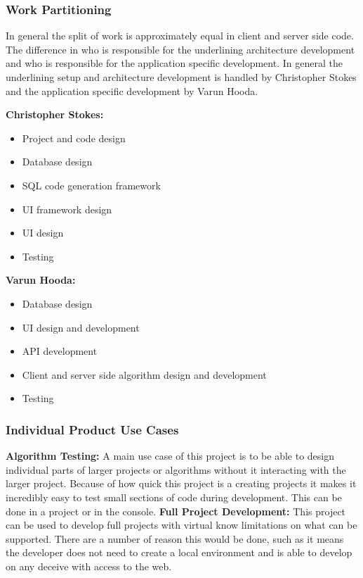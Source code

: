 \documentclass[12pt, titlepage]{article}
\begin{document}
    \subsubsection{Work Partitioning}
    In general the split of work is approximately equal in client and server 
    side code. The difference in who is responsible for the underlining architecture 
    development and who is responsible for the application specific development. In 
    general the underlining setup and architecture development is handled by 
    Christopher Stokes and the application specific development by Varun Hooda.

    \textbf{Christopher Stokes:}
    \begin{itemize}
        \item Project and code design
        \item Database design
        \item SQL code generation framework
        \item UI framework design
        \item UI design
        \item Testing
    \end{itemize}


    \textbf{Varun Hooda:}
    \begin{itemize}
        \item Database design
        \item UI design and development
        \item API development
        \item Client and server side algorithm design and development
        \item Testing
    \end{itemize}

    \subsubsection{Individual Product Use Cases}
    \textbf{Algorithm Testing:} A main use case of this project is to be able 
    to design individual parts of larger projects or algorithms without it 
    interacting with the larger project. Because of how quick this project is 
    a creating  projects it makes it incredibly easy to test small sections of 
    code during development. This can be done in a project or in the console. 
    \newline\newline
    \textbf{Full Project Development:} This project can be used to develop 
    full projects with virtual know limitations on what can be supported. 
    There are a number of reason this would be done, such as it means the 
    developer does not need to create a local environment and is able to 
    develop on any deceive with access to the web.
\end{document}

